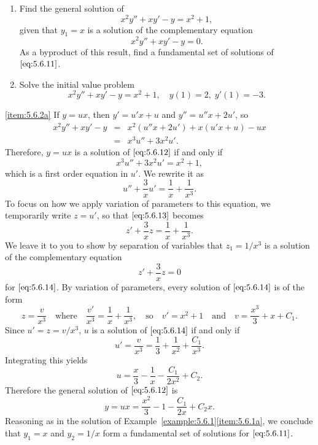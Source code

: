 \documentclass{ximera}
\begin{document}
\begin{example}\label{example:5.6.2}
\begin{enumerate}
\item \label{item:5.6.2a} %
Find the general solution of
$$
x^2y''+xy'-y=x^2+1,
$$
 given that $y_1=x$ is a solution of the complementary
equation
\begin{equation}  \label{eq:5.6.11}
x^2y''+xy'-y=0.
\end{equation}
As a byproduct of this result, find a fundamental set of
solutions of $\eqref{eq:5.6.11}$.
 
\item \label{item:5.6.2b}%
Solve the initial value problem
\begin{equation}  \label{eq:5.6.12}
x^2y''+xy'-y=x^2+1, \quad   y(1)=2,\;  y'(1)=-3.
\end{equation}
\end{enumerate}
 
 
\begin{explanation}\ref{item:5.6.2a} If $y=ux$, then $y'=u'x+u$ and $y''=u''x+2u'$, so
\begin{eqnarray*}
x^2y''+xy'-y&=&x^2(u''x+2u')+x(u'x+u)-ux\\
&=&x^3u''+3x^2u'.
\end{eqnarray*}
Therefore, $y=ux$ is a solution of $\eqref{eq:5.6.12}$ if and only if
$$
x^3u''+3x^2u'=x^2+1,
$$
which is a first order equation in $u'$.
We rewrite it as
\begin{equation} \label{eq:5.6.13}
u''+\frac{3}{x}u'=\frac{1}{x}+\frac{1}{x^3}.
\end{equation}
To focus on how we apply variation of parameters to this equation, we
temporarily write $z=u'$, so that $\eqref{eq:5.6.13}$ becomes
\begin{equation} \label{eq:5.6.14}
z'+\frac{3}{x}z=\frac{1}{x}+\frac{1}{x^3}.
\end{equation}
We leave it to you to show by separation of variables that
$z_1=1/x^3$ is a solution of the complementary equation
$$
z'+\frac{3}{x}z=0
$$
for $\eqref{eq:5.6.14}$. By variation of parameters, every solution of
$\eqref{eq:5.6.14}$ is of the form
$$
z=\frac{v}{x^3}\quad\mbox{where}\quad
\frac{v'}{x^3}=\frac{1}{x}+\frac{1}{x^3}, \quad\mbox{so}\quad
 v'=x^2+1 \quad\mbox{and}\quad v=\frac{x^3}{3}+x+C_1.
$$
Since $u'=z=v/x^3$,   $u$ is a solution of $\eqref{eq:5.6.14}$ if and only
if
$$
u'=\frac{v}{x^3}=\frac{1}{3}+\frac{1}{x^2}+\frac{C_1}{x^3}.
$$
Integrating this yields
$$
u=\frac{x}{3}-\frac{1}{x}-\frac{C_1}{2x^2}+C_2.
$$
Therefore the general solution of $\eqref{eq:5.6.12}$ is
\begin{equation} \label{eq:5.6.15}
y=ux=\frac{x^2}{3}-1-\frac{C_1}{2x}+C_2x.
\end{equation}
Reasoning as in the solution of
Example~\ref{example:5.6.1}\ref{item:5.6.1a}, we conclude that $y_1=x$ and $y_2=1/x$
form a fundamental set of solutions for $\eqref{eq:5.6.11}$.
 

\end{explanation}
\end{example}
\end{document}
